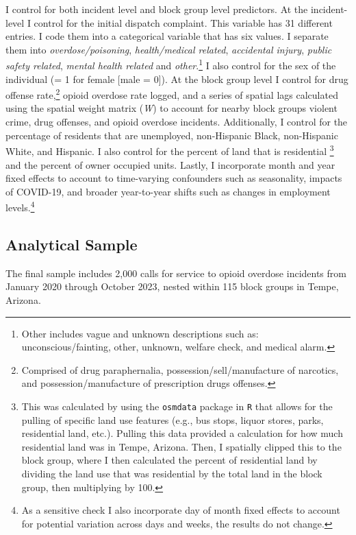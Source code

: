 I control for both incident level and block group level predictors. At the incident-level I control for the initial dispatch complaint. This variable has 31 different entries. I code them into a  categorical variable that has six values. I separate them into \textit{overdose/poisoning}, \textit{health/medical related}, \textit{accidental injury}, \textit{public safety related}, \textit{mental health related} and \textit{other}.\footnote{Other includes vague and unknown descriptions such as: unconscious/fainting, other, unknown, welfare check, and medical alarm.} I also control for the sex of the individual (= 1 for female [male = 0]). At the block group level I control for drug offense rate,\footnote{Comprised of drug paraphernalia, possession/sell/manufacture of narcotics, and possession/manufacture of prescription drugs offenses.} opioid overdose rate logged, and a series of spatial lags calculated using the spatial weight matrix (\textit{W}) to account for nearby block groups violent crime, drug offenses, and opioid overdose incidents. Additionally, I control for the percentage of residents that are unemployed, non-Hispanic Black, non-Hispanic White, and Hispanic. I also control for the percent of land that is residential \footnote{This was calculated by using the \texttt{osmdata} package in \texttt{R} that allows for the pulling of specific land use features (e.g., bus stops, liquor stores, parks, residential land, etc.). Pulling this data provided a calculation for how much residential land was in Tempe, Arizona. Then, I spatially clipped this to the block group, where I then calculated the percent of residential land by dividing the land use that was residential by the total land in the block group, then multiplying by 100.} and the percent of owner occupied units. Lastly, I incorporate month and year fixed effects to account to time-varying confounders such as seasonality, impacts of COVID-19, and broader year-to-year shifts such as changes in employment levels.\footnote{As a sensitive check I also incorporate day of month fixed effects to account for potential variation across days and weeks, the results do not change.}

\subsection{Analytical Sample}
The final sample includes 2,000 calls for service to opioid overdose incidents from January 2020 through October 2023, nested within 115 block groups in Tempe, Arizona.

